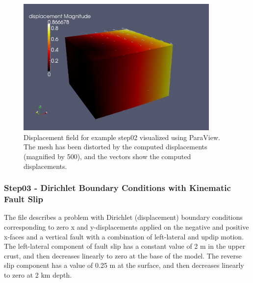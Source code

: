 \begin{figure}
  \includegraphics[width=10cm]{examples/figs/3dhex8_step02-displ}
  \caption{Displacement field for example step02 visualized using ParaView. The
    mesh has been distorted by the computed displacements (magnified by
    500), and the vectors show the computed displacements.}
  \label{fig:example:3dhex8:step02:displacement}
\end{figure}


\subsubsection{Step03 - Dirichlet Boundary Conditions with Kinematic Fault Slip}

The  file describes a problem with Dirichlet (displacement)
boundary conditions corresponding to zero x and y-displacements applied
on the negative and positive x-faces and a vertical fault with a combination
of left-lateral and updip motion. The left-lateral component of fault
slip has a constant value of 2 m in the upper crust, and then decreases
linearly to zero at the base of the model. The reverse slip component
has a value of 0.25 m at the surface, and then decreases linearly
to zero at 2 km depth.

